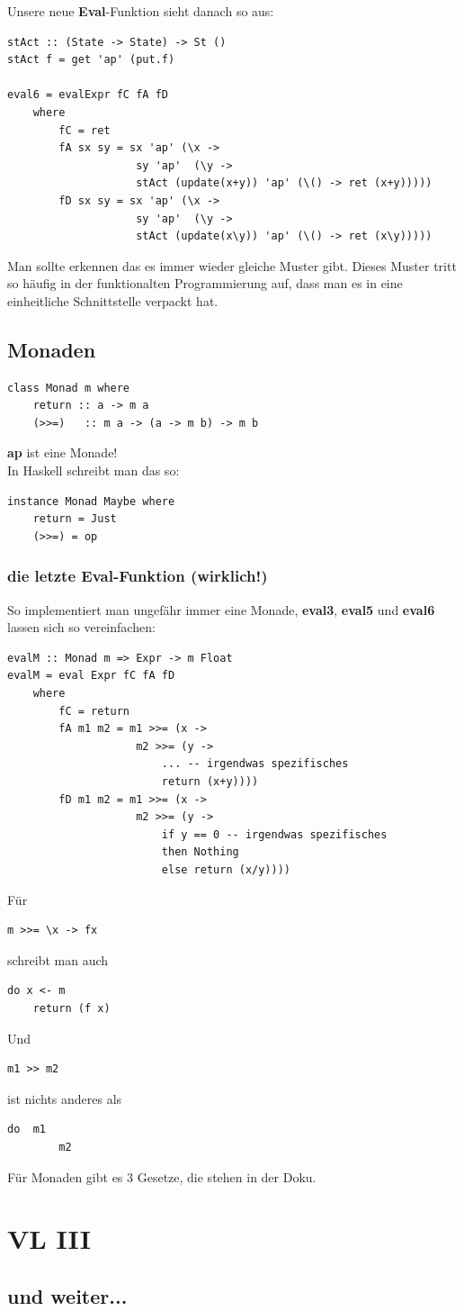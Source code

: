 \documentclass[ngerman,a4paper]{report}
\begin{document}
Unsere neue \textbf{Eval}-Funktion sieht danach so aus:

\begin{lstlisting}
stAct :: (State -> State) -> St ()
stAct f = get 'ap' (put.f)

eval6 = evalExpr fC fA fD
	where
		fC = ret
		fA sx sy = sx 'ap' (\x ->
					sy 'ap'	 (\y -> 
					stAct (update(x+y)) 'ap' (\() -> ret (x+y)))))
		fD sx sy = sx 'ap' (\x ->
					sy 'ap'	 (\y -> 
					stAct (update(x\y)) 'ap' (\() -> ret (x\y)))))
\end{lstlisting}

Man sollte erkennen das es immer wieder gleiche Muster gibt. Dieses Muster tritt so häufig in der funktionalten Programmierung auf, dass man es in eine einheitliche Schnittstelle verpackt hat.
\section{Monaden}
\begin{lstlisting}
class Monad m where
	return :: a -> m a
	(>>=)	:: m a -> (a -> m b) -> m b
\end{lstlisting}
\textbf{ap} ist eine Monade!\\
In Haskell schreibt man das so:
\begin{lstlisting}
instance Monad Maybe where
	return = Just
	(>>=) = op
\end{lstlisting}

\subsection{die letzte Eval-Funktion (wirklich!)}
So implementiert man ungefähr immer eine Monade, \textbf{eval3}, \textbf{eval5} und \textbf{eval6} lassen sich so vereinfachen:
\begin{lstlisting}
evalM :: Monad m => Expr -> m Float
evalM = eval Expr fC fA fD
	where
		fC = return
		fA m1 m2 = m1 >>= (x -> 
					m2 >>= (y ->
						... -- irgendwas spezifisches
						return (x+y))))
		fD m1 m2 = m1 >>= (x -> 
					m2 >>= (y ->
						if y == 0 -- irgendwas spezifisches
						then Nothing
						else return (x/y))))
\end{lstlisting}
Für
\begin{lstlisting}
m >>= \x -> fx
\end{lstlisting}
schreibt man auch
\begin{lstlisting}
do x <- m
	return (f x)
\end{lstlisting}

Und
\begin{lstlisting}
m1 >> m2
\end{lstlisting}
ist nichts anderes als
\begin{lstlisting}
do	m1
		m2
\end{lstlisting}

Für Monaden gibt es 3 Gesetze, die stehen in der Doku.

\chapter{VL III}
\section {und weiter...}
\end{document}
